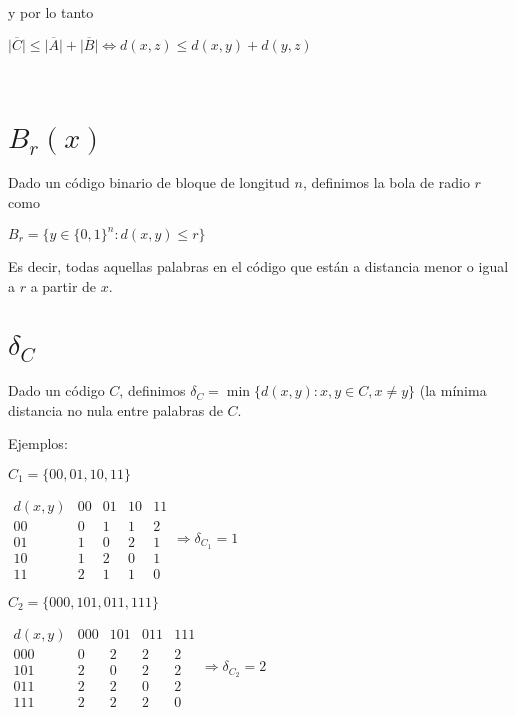 \documentclass[10pt,a4paper]{article}
\begin{document}
y por lo tanto

\begin{center}
$\lvert \overline{C}\rvert \leq \lvert \overline{A}\rvert +\lvert \overline{B}\rvert \Leftrightarrow d(x,z) \leq d(x, y) + d(y, z)$
\end{center}

\begin{center}
 
\end{center}

\section*{$B_r(x)$}

Dado un código binario de bloque de longitud $n$, definimos la bola de radio $r$ como

\begin{center}
$B_r = \{y \in \{0, 1\}^n : d(x, y)\leq r\}$
\end{center}

Es decir, todas aquellas palabras en el código que están a distancia menor o igual a $r$ a partir de $x$.

\section*{$\delta_C$}

Dado un código $C$, definimos $\delta_C = \min\{d(x, y): x, y \in C, x \neq y\}$ (la mínima distancia no nula entre palabras de $C$.

Ejemplos:

$C_1 = \{00, 01, 10, 11\}$

\begin{center}
$\begin{array}{c|cccc}
d(x, y) & 00 & 01 & 10 & 11\\
\hline
00 & 0 & 1 &1 & 2 \\
01 & 1 & 0& 2 & 1\\
10 & 1 & 2 & 0 & 1\\
11 & 2 & 1 & 1 & 0
\end{array}
\Rightarrow \delta_{C_1} = 1$
\end{center}

$C_2 = \{000, 101, 011, 111\}$

\begin{center}
$\begin{array}{c|cccc}
d(x, y) & 00 0& 101 & 011 & 111\\
\hline
000 & 0 & 2 &2 & 2 \\
101 & 2 & 0& 2 & 2\\
011 & 2 & 2 & 0 & 2\\
111 & 2 & 2 & 2 & 0
\end{array}
\Rightarrow \delta_{C_2} = 2$
\end{center}
\end{document}
